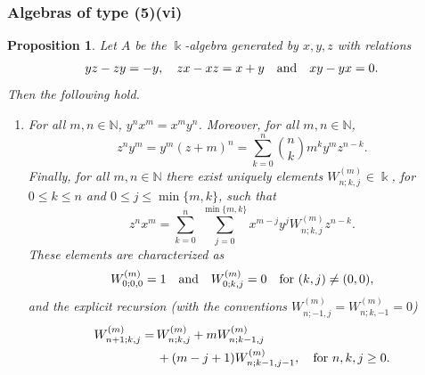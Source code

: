 \documentclass{amsart}
\newtheorem{proposition}[theorem]{Proposition}
\theoremstyle{definition}
\theoremstyle{remark}
\numberwithin{equation}{section}
\begin{document}
\subsubsection{Algebras of type (5)(vi)}

\begin{proposition}\label{Case(5)(iv)}
Let $A$ be the $\Bbbk$-algebra generated by $x,y,z$ with relations
\[
yz - zy = -y,\quad zx - xz = x+y \quad {\rm and} \quad xy - yx = 0.
\]
Then the following hold.

\begin{enumerate}
\item [\rm (1)] For all $m,n\in\mathbb N$, $y^n x^m=x^m y^n$. Moreover, for all $m,n\in\mathbb N$,
\begin{equation}\label{znymcase5ivclosed}
z^n y^m = y^m\left(z+m\right)^n = \sum_{k=0}^{n}\binom{n}{k}m^k y^m z^{ n-k}.
\end{equation}
Finally, for all $m,n\in\mathbb N$ there exist uniquely elements $W^{(m)}_{n;k,j}\in\Bbbk$, for $0\le k\le n$ and $0\le j\le \min\{m,k\}$, such that
\begin{equation}\label{znxmcase5ivWdef}
z^n x^m = \sum_{k=0}^{n}\ \sum_{j=0}^{\min\{m,k\}} x^{m-j}y^{j} W^{(m)}_{n;k,j} z^{ n-k}.
\end{equation}
These elements are characterized as
\[
W^{(m)}_{0;0,0} = 1 \quad {\rm and} \quad W^{(m)}_{0;k,j} = 0 \quad {\rm for}\, \, (k,j)\neq(0,0),
\]
and the explicit recursion {\rm (}with the conventions $W^{(m)}_{n;-1,j}=W^{(m)}_{n;k,-1}=0${\rm )}
\begin{align}
W^{(m)}_{n+1;k,j} = &\, W^{(m)}_{n;k,j}+m W^{(m)}_{n;k-1,j} \\
&\, +(m-j+1) W^{(m)}_{n;k-1,j-1}, \quad {\rm for} \, \, n, k, j \ge 0. \label{Wreccase5iv}
\end{align}


\end{enumerate}
\end{proposition}
\end{document}
